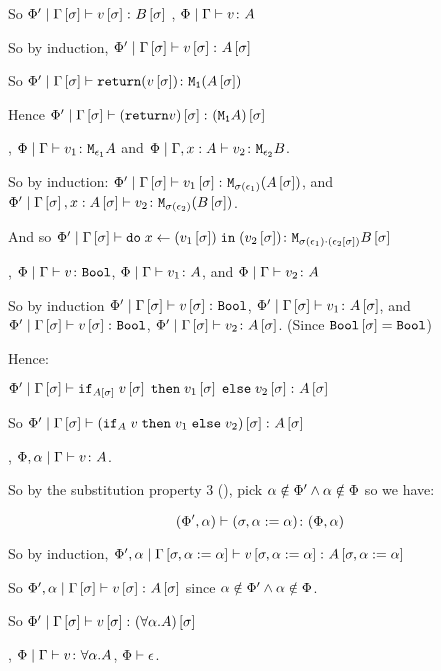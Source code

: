 {    So $\etyperelation{\P'}{\G\ssi}{v\ssi}{B\ssi}$
    \bi, $\gpetyperelation{v}{A}$

    So by induction, $\etyperelation{\P'}{\G\ssi}{v\ssi}{A\ssi}$

    So $\etyperelation{\P'}{\G\ssi}{\return{(v\ssi)}}{\M{\1}{(A\ssi)}}$

    Hence $\etyperelation{\P'}{\G\ssi}{(\return{v})\ssi}{(\moa)\ssi}$

    \bi, $\gpetyperelation{v_1}{\M{\e_1}{A}}$ and $\etyperelation{\P}{\gax}{v_2}{\M{\e_2}{B}}$.

    So by induction: $\etyperelation{\P'}{\G\ssi}{v_1\ssi}{\M{\si(\e_1)}{(A\ssi)}}$, and $\etyperelation{\P'}{\G\ssi, x:A\ssi}{v_2}{\M{\si(\e_2)}{(B\ssi)}}$.

    And so $\etyperelation{\P'}{\G\ssi}{\doin{x}{(v_1\ssi)}{(v_2\ssi)}}{\M{\si(\e_1)\dot(\e_2\ssi)}{B\ssi}}$



    \bi, $\gpetyperelation{v}{\B}$, $\gpetyperelation{v_1}{A}$, and $\gpetyperelation{v_2}{A}$

    So by induction $\etyperelation{\P'}{\G\ssi}{v\ssi}{\B}$, $\etyperelation{\P'}{\G\ssi}{v_1}{A\ssi}$, and $\etyperelation{\P'}{\G\ssi}{v\ssi}{\B}$, $\etyperelation{\P'}{\G\ssi}{v_2}{A\ssi}$.
    (Since $\B\ssi = \B$)

    Hence:

    $\etyperelation{\P'}{\G\ssi}{\pifthenelse{A\ssi}{v\ssi}{v_1\ssi}{v_2\ssi}}{A\ssi}$

    So $\etyperelation{\P'}{\G\ssi}{(\pifthenelse{A}{v}{v_1}{v_2})\ssi}{A\ssi}$

    \bi, $\etyperelation{\P,\a}{\G}{v}{A}$.

    So by the substitution property 3 (), pick $\a\notin\P'\wedge\a\notin\P$ so we have:

    $$\typerelation{(\P',\a)}{(\si, \a\setto\a)}{(\P,\a)}$$

    So by induction, $\etyperelation{\P', \a}{\G\sub{\si, \a\setto\a}}{v\sub{\si,\a\setto\a}}{A\sub{\si, \a\setto\a}}$

    So $\etyperelation{\P',\a}{\G\ssi}{v\ssi}{A\ssi}$ since $\a\notin\P' \wedge\a\notin\P$.

    So $\etyperelation{\P'}{\G\ssi}{v\ssi}{(\all{\a}{A})\ssi}$
    
    \bi, $\gpetyperelation{v}{\all{\a}{A}}$, $\wellformed{\P}{\e}$.

}
